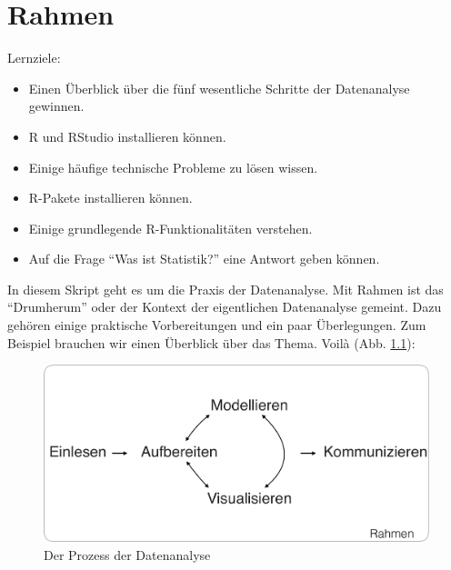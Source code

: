 \documentclass[12pt,ngerman,]{book}
\providecommand{\tightlist}{%
  \setlength{\itemsep}{0pt}\setlength{\parskip}{0pt}}
\let\BeginKnitrBlock\begin \let\EndKnitrBlock\end
\begin{document}
\chapter{Rahmen}\label{rahmen}

\BeginKnitrBlock{rmdcaution}
Lernziele:

\begin{itemize}
\tightlist
\item
  Einen Überblick über die fünf wesentliche Schritte der Datenanalyse
  gewinnen.
\item
  R und RStudio installieren können.
\item
  Einige häufige technische Probleme zu lösen wissen.
\item
  R-Pakete installieren können.
\item
  Einige grundlegende R-Funktionalitäten verstehen.
\item
  Auf die Frage ``Was ist Statistik?'' eine Antwort geben können.
\end{itemize}
\EndKnitrBlock{rmdcaution}

In diesem Skript geht es um die Praxis der Datenanalyse. Mit Rahmen ist
das ``Drumherum'' oder der Kontext der eigentlichen Datenanalyse
gemeint. Dazu gehören einige praktische Vorbereitungen und ein paar
Überlegungen. Zum Beispiel brauchen wir einen Überblick über das Thema.
Voilà (Abb. \ref{fig:fig-prozess}):

\begin{figure}

{\centering \includegraphics[width=0.7\linewidth]{images/Prozess_Datenanalyse} 

}

\caption{Der Prozess der Datenanalyse}\label{fig:fig-prozess}
\end{figure}
\end{document}
